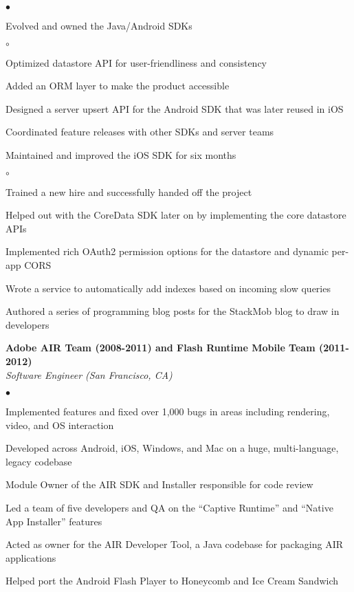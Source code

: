 \documentclass[ComputerScience]{vita}
\newenvironment{suber}[0]
{\begin{list}{$\bullet$}
	{\setlength{\topsep}{-0.4in}
		\setlength{\leftmargin}{0.25in}
		\setlength{\itemsep}{0.01in}}
}
{\end{list}\par}
\newenvironment{suberb}[0]
{\begin{list}{$\circ$}
	{\setlength{\topsep}{-0.4in}
		\setlength{\leftmargin}{0.25in}
		\setlength{\itemsep}{0.01in}}
}
{\end{list}\par}
\begin{document}
\begin{vita}
\begin{list}{}{\setlength{\leftmargin}{.25in}}
\begin{suber}
	\item Evolved and owned the Java/Android SDKs
		\begin{suberb}
    	\item Optimized datastore API for user-friendliness and consistency
    	\item Added an ORM layer to make the product accessible
			\item Designed a server upsert API for the Android SDK that was later reused in iOS
			\item Coordinated feature releases with other SDKs and server teams
		\end{suberb}
	\item Maintained and improved the iOS SDK for six months
		\begin{suberb}
    	\item Trained a new hire and successfully handed off the project
    	\item Helped out with the CoreData SDK later on by implementing the core datastore APIs
		\end{suberb}
	\item Implemented rich OAuth2 permission options for the datastore and dynamic per-app CORS
	\item Wrote a service to automatically add indexes based on incoming slow queries
	\item Authored a series of programming blog posts for the StackMob blog to draw in developers
    \end{suber}
    \item {\bf Adobe AIR Team (2008-2011) and Flash Runtime Mobile Team (2011-2012)}\\
    {\em Software Engineer (San Francisco, CA)}
    \begin{suber}
	\item Implemented features and fixed over 1,000 bugs in areas including rendering, video, and OS interaction 
	\item Developed across  Android, iOS, Windows, and Mac on a huge, multi-language, legacy codebase
	\item Module Owner of the AIR SDK and Installer responsible for code review
	\item Led a team of five developers and QA on the ``Captive Runtime'' and ``Native App Installer'' features
	\item Acted as owner for the AIR Developer Tool, a Java codebase for packaging AIR applications
	\item Helped port the Android Flash Player to Honeycomb and Ice Cream Sandwich

\end{suber}
\end{list}
\end{vita}
\end{document}
